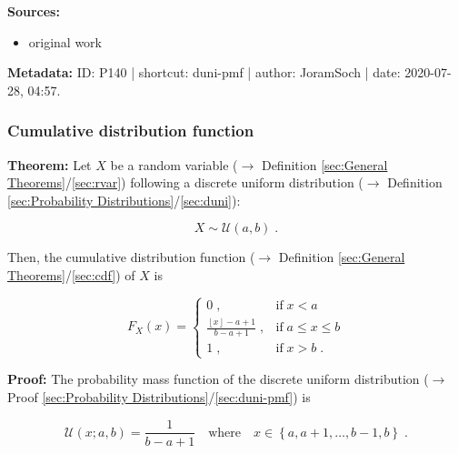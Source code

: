 \documentclass[a4paper,12pt,twoside]{book}
\begin{document}
\vspace{1em}
\textbf{Sources:}
\begin{itemize}
\item original work\end{itemize}


\vspace{1em}
\textbf{Metadata:} ID: P140 | shortcut: duni-pmf | author: JoramSoch | date: 2020-07-28, 04:57.
\vspace{1em}



\subsubsection[\textbf{Cumulative distribution function}]{Cumulative distribution function} \label{sec:duni-cdf}
\setcounter{equation}{0}

\textbf{Theorem:} Let $X$ be a random variable ($\rightarrow$ Definition \ref{sec:General Theorems}/\ref{sec:rvar}) following a discrete uniform distribution ($\rightarrow$ Definition \ref{sec:Probability Distributions}/\ref{sec:duni}):

\begin{equation} \label{eq:duni-cdf-duni}
X \sim \mathcal{U}(a, b) \; .
\end{equation}

Then, the cumulative distribution function ($\rightarrow$ Definition \ref{sec:General Theorems}/\ref{sec:cdf}) of $X$ is

\begin{equation} \label{eq:duni-cdf-duni-cdf}
F_X(x) = \left\{
\begin{array}{rl}
0 \; , & \text{if} \; x < a \\
\frac{\left\lfloor{x}\right\rfloor - a + 1}{b - a + 1} \; , & \text{if} \; a \leq x \leq b \\
1 \; , & \text{if} \; x > b \; .
\end{array}
\right.
\end{equation}


\vspace{1em}
\textbf{Proof:} The probability mass function of the discrete uniform distribution ($\rightarrow$ Proof \ref{sec:Probability Distributions}/\ref{sec:duni-pmf}) is

\begin{equation} \label{eq:duni-cdf-duni-pmf}
\mathcal{U}(x; a, b) = \frac{1}{b-a+1} \quad \text{where} \quad x \in \left\lbrace a, a+1, \ldots, b-1, b \right\rbrace \; .
\end{equation}
\end{document}
